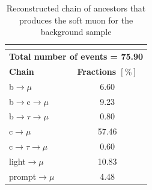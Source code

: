 \begin{table}[!h]
	\centering          
	\begin{tabular}{|l|c|}          
		\hline          
		\multicolumn{2}{|l|}{\textbf{\VVHF}}    \\        
		\hline          
		\multicolumn{2}{|l|}{\textbf{Total number of events = 75.90}}    \\
		\hline
		\textbf{Chain}        									 & \textbf{Fractions $[\%]$} \\                          
		\hline          
		b$\rightarrow \mu$                 					&   6.60  \\          
		b$\rightarrow$c$\rightarrow \mu$     	&    9.23    \\          
		b$\rightarrow \tau \rightarrow \mu$  	&    0.80 \\          
		c$\rightarrow \mu$                 				 &    57.46\\          
		c$\rightarrow \tau \rightarrow \mu$  	&     0.60\\          
		light$\rightarrow \mu$              			&    10.83 \\          
		prompt$\rightarrow \mu$                	 	&  4.48\\            
		\hline    
	\end{tabular}    
	\caption{Reconstructed chain of ancestors that produces the soft muon for the background sample \VVHF }
	\label{tab:VV_comp}
\end{table}    
\clearpage
